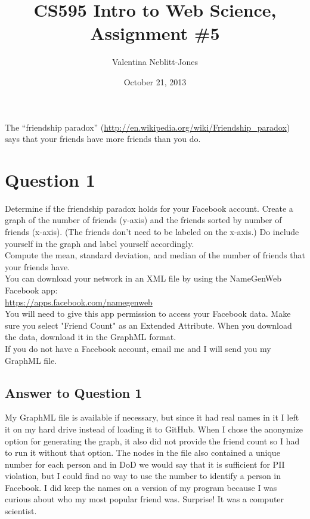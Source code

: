 \documentclass{article}
\begin{document}
\title{CS595 Intro to Web Science, Assignment \#5}
\author{Valentina Neblitt-Jones}
\date{October 21, 2013}
\maketitle

The ``friendship paradox'' (\url{http://en.wikipedia.org/wiki/Friendship_paradox})  says that your friends have more friends than you do. \\

\section*{Question 1}

Determine if the friendship paradox holds for your Facebook account. Create a graph of the number of friends (y-axis) and the friends sorted by number of friends (x-axis). (The friends don't need to be labeled on the x-axis.) Do include yourself in the graph and label yourself accordingly. \\

Compute the mean, standard deviation, and median of the number of friends that your friends have. \\

You can download your network in an XML file by using the NameGenWeb Facebook app:  \\

\url{https://apps.facebook.com/namegenweb} \\

You will need to give this app permission to access your Facebook data. Make sure you select "Friend Count" as an Extended Attribute. When you download the data, download it in the GraphML format. \\

If you do not have a Facebook account, email me and I will send you my GraphML file.

\subsection*{Answer to Question 1}

My GraphML file is available if necessary, but since it had real names in it I left it on my hard drive instead of loading it to GitHub. When I chose the anonymize option for generating the graph, it also did not provide the friend count so I had to run it without that option. The nodes in the file also contained a unique number for each person and in DoD we would say that it is sufficient for PII violation, but I could find no way to use the number to identify a person in Facebook. I did keep the names on a version of my program because I was curious about who my most popular friend was. Surprise! It was a computer scientist.
\end{document}
